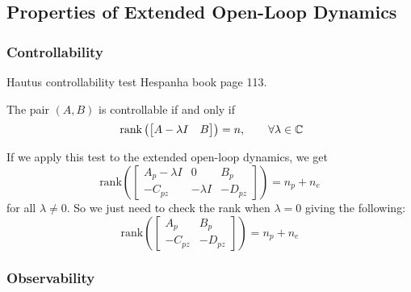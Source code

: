 \subsection{Properties of Extended Open-Loop Dynamics}

\subsubsection{Controllability}
Hautus controllability test Hespanha book page 113.

\begin{thm-dan}
  The pair $(A,B)$ is controllable if and only if
  \begin{equation*}
    \text{\normalfont\ rank}\left(
      \begin{bmatrix}
        A-\lambda  I & B
      \end{bmatrix}
    \right)=n,
    \qquad
    \forall\lambda\in\mathbb{C}
  \end{equation*}
\end{thm-dan}

If we apply this test to the extended open-loop dynamics, we get
\begin{equation*}
  \text{rank}\left(
    \begin{bmatrix}
      A_{p}-\lambda I & 0 & B_{p} \\
      -C_{pz} & -\lambda I & -D_{pz}
    \end{bmatrix}
  \right)
  =n_{p}+n_{e}
\end{equation*}
for all $\lambda\neq0$.
So we just need to check the rank when $\lambda=0$ giving the following:
\begin{equation*}
  \text{rank}\left(
    \begin{bmatrix}
      A_{p} & B_{p} \\
      -C_{pz} & -D_{pz}
    \end{bmatrix}
  \right)
  =n_{p}+n_{e}
\end{equation*}

\subsubsection{Observability}

